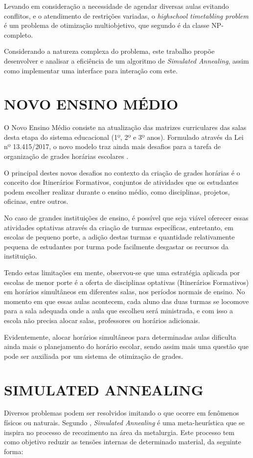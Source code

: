 Levando em consideração a necessidade de agendar diversas aulas evitando conflitos, e o atendimento de restrições variadas, o \textit{highschool timetabling problem} é um problema de otimização multiobjetivo, que segundo  é da classe NP-completo.

Considerando a natureza complexa do problema, este trabalho propõe desenvolver e analisar a eficiência de um algoritmo de \textit{Simulated Annealing}, assim como implementar uma interface para interação com este.

\section{NOVO ENSINO MÉDIO}
\label{sec:novo_ensino_medio}
O Novo Ensino Médio consiste na atualização das matrizes curriculares das salas desta etapa do sistema educacional (1º, 2º e 3º anos). Formulado através da Lei nº 13.415/2017, o novo modelo traz ainda mais desafios para a tarefa de organização de grades horárias escolares \cite{lei13415}.

O principal destes novos desafios no contexto da criação de grades horárias é o conceito dos Itinerários Formativos, conjuntos de atividades que os estudantes podem escolher realizar durante o ensino médio, como disciplinas, projetos, oficinas, entre outros.

No caso de grandes instituições de ensino, é possível que seja viável oferecer essas atividades optativas através da criação de turmas específicas, entretanto, em escolas de pequeno porte, a adição destas turmas e quantidade relativamente pequena de estudantes por turma pode facilmente desgastar os recursos da instituição.

Tendo estas limitações em mente, observou-se que uma estratégia aplicada por escolas de menor porte é a oferta de disciplinas optativas (Itinerários Formativos) em horários simultâneos em diferentes salas, nos períodos normais de ensino. No momento em que essas aulas acontecem, cada aluno das duas turmas se locomove para a sala adequada onde a aula que escolheu será ministrada, e com isso a escola não precisa alocar salas, professores ou horários adicionais. 

Evidentemente, alocar horários simultâneos para determinadas aulas dificulta ainda mais o planejamento do horário escolar, sendo assim mais uma questão que pode ser auxiliada por um sistema de otimização de grades.

\section{SIMULATED ANNEALING}
Diversos problemas podem ser resolvidos imitando o que ocorre em fenômenos físicos ou naturais. Segundo , \textit{Simulated Annealing} é uma meta-heurística que se inspira no processo de recozimento na área da metalurgia. Este processo tem como objetivo reduzir as tensões internas de determinado material, da seguinte forma:

